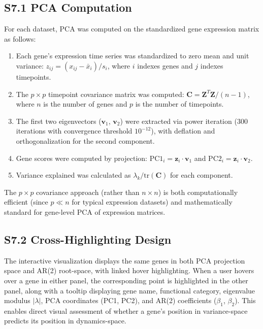 \documentclass[11pt,a4paper]{article}
\begin{document}
\subsection{S7.1 PCA Computation}

For each dataset, PCA was computed on the standardized gene expression matrix as follows:

\begin{enumerate}
    \item Each gene's expression time series was standardized to zero mean and unit variance: $z_{ij} = (x_{ij} - \bar{x}_i) / s_i$, where $i$ indexes genes and $j$ indexes timepoints.
    \item The $p \times p$ timepoint covariance matrix was computed: $\mathbf{C} = \mathbf{Z}^T\mathbf{Z} / (n-1)$, where $n$ is the number of genes and $p$ is the number of timepoints.
    \item The first two eigenvectors ($\mathbf{v}_1$, $\mathbf{v}_2$) were extracted via power iteration (300 iterations with convergence threshold $10^{-12}$), with deflation and orthogonalization for the second component.
    \item Gene scores were computed by projection: $\text{PC1}_i = \mathbf{z}_i \cdot \mathbf{v}_1$ and $\text{PC2}_i = \mathbf{z}_i \cdot \mathbf{v}_2$.
    \item Variance explained was calculated as $\lambda_k / \text{tr}(\mathbf{C})$ for each component.
\end{enumerate}

\noindent The $p \times p$ covariance approach (rather than $n \times n$) is both computationally efficient (since $p \ll n$ for typical expression datasets) and mathematically standard for gene-level PCA of expression matrices.

\subsection{S7.2 Cross-Highlighting Design}

The interactive visualization displays the same genes in both PCA projection space and AR(2) root-space, with linked hover highlighting. When a user hovers over a gene in either panel, the corresponding point is highlighted in the other panel, along with a tooltip displaying gene name, functional category, eigenvalue modulus $|\lambda|$, PCA coordinates (PC1, PC2), and AR(2) coefficients ($\beta_1$, $\beta_2$). This enables direct visual assessment of whether a gene's position in variance-space predicts its position in dynamics-space.
\end{document}
